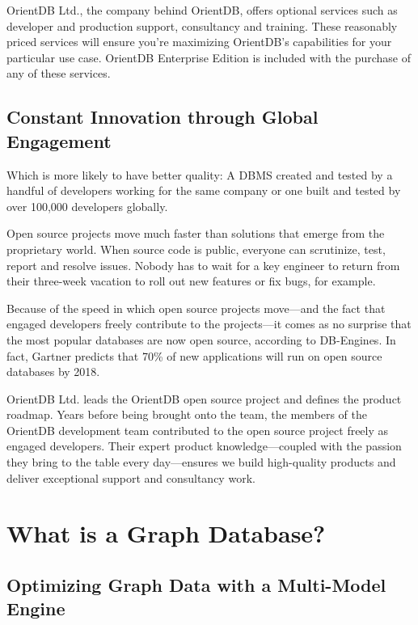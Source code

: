 \documentclass[
	final,
	a4paper,
	oneside,
	parskip=half,
	headings=standardclasses,
	headings=big,
	pointednumbers,
    fleqn
]{scrartcl}
\begin{document}
\begin{multicols*}{2}
            OrientDB Ltd., the company behind OrientDB, offers optional services such as developer and production support, consultancy and training. These reasonably priced services will ensure you’re maximizing OrientDB’s capabilities for your particular use case. OrientDB Enterprise Edition is included with the purchase of any of these services.

        \subsection{Constant Innovation through Global Engagement}

            Which is more likely to have better quality: A DBMS created and tested by a handful of developers working for the same company or one built and tested by over 100,000 developers globally.

            Open source projects move much faster than solutions that emerge from the proprietary world. When source code is public, everyone can scrutinize, test, report and resolve issues. Nobody has to wait for a key engineer to return from their three-week vacation to roll out new features or fix bugs, for example.

            Because of the speed in which open source projects move—and the fact that engaged developers freely contribute to the projects—it comes as no surprise that the most popular databases are now open source, according to DB-Engines. In fact, Gartner predicts that 70\% of new applications will run on open source databases by 2018.

            OrientDB Ltd. leads the OrientDB open source project and defines the product roadmap. Years before being brought onto the team, the members of the OrientDB development team contributed to the open source project freely as engaged developers. Their expert product knowledge—coupled with the passion they bring to the table every day—ensures we build high-quality products and deliver exceptional support and consultancy work.

    \section{What is a Graph Database?}

        \subsection{Optimizing Graph Data with a Multi-Model Engine}


\end{multicols*}
\end{document}
